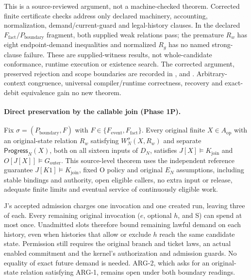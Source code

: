 \documentclass[11pt,a4paper]{article}
\theoremstyle{definition}
\theoremstyle{remark}
\begin{document}
This is a source-reviewed argument, not a machine-checked theorem. Corrected finite certificate checks address only declared machinery, accounting, normalization, demand/current-guard and legal-history clauses. In the declared $F_{\mathrm{fact}}/P_{\mathrm{boundary}}$ fragment, both supplied weak relations pass; the premature $R_w$ has eight endpoint-demand inequalities and normalized $R_g$ has no named strong-clause failure. These are supplied-witness results, not whole-candidate conformance, runtime execution or existence search. The corrected argument, preserved rejection and scope boundaries are recorded in ,  and . Arbitrary-context congruence, universal compiler/runtime correctness, recovery and exact-debit equivalence gain no new theorem.

\paragraph{Direct preservation by the callable join (Phase 1P).} Fix $\sigma=(P_{\mathrm{boundary}},F)$ with $F\in\{F_{\mathrm{event}},F_{\mathrm{fact}}\}$. Every original finite $X\in A_{\mathrm{op}}$ with an original-state relation $R_w$ satisfying $W_N^\sigma(X,R_w)$ and separate $\mathsf{Progress}_N(X)$, both on all sixteen inputs of $D_N$, satisfies $J[X]\models K_{\mathrm{join}}$ and $O[J[X]]\models G_{\mathrm{outer}}$. This source-level theorem uses the independent reference guarantee $J[K1]\models K_{\mathrm{join}}$, fixed O policy and original $E_N$ assumptions, including stable bindings and authority, open eligible callers, no extra input or release, adequate finite limits and eventual service of continuously eligible work.

J's accepted admission charges one invocation and one created run, leaving three of each. Every remaining original invocation ($e$, optional $h$, and S) can spend at most once. Unadmitted slots therefore bound remaining lawful demand on each history, even when histories that allow or exclude $h$ reach the same candidate state. Permission still requires the original branch and ticket laws, an actual enabled commitment and the kernel's authorization and admission guards. No equality of exact future demand is needed. ARG-2, which asks for an original-state relation satisfying ARG-1, remains open under both boundary readings.
\end{document}
